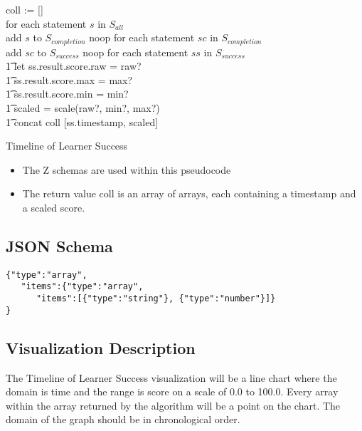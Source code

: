 \documentclass{article}
\begin{document}
  \begin{algorithm}[H]
    \SetAlgoLined
    coll := [] \\
     {
      for each statement $s$ in $S_{all}$ \\
      {
        add $s$ to $S_{completion}$
      }
      {
        noop
      }}
     {
      for each statement $sc$ in $S_{completion}$ \\
      {
        add $sc$ to $S_{success}$
      }
      {
        noop
      }}
     {
      for each statement $ss$ in $S_{success}$ \\
      \t1 let ss.result.score.raw = raw? \\ \t1 \:\:\:\:\:
          ss.result.score.max = max? \\ \t1 \:\:\:\:\:
          ss.result.score.min = min? \\ \t1 \:\:\:\:\:
          scaled = scale(raw?, min?, max?) \\
       \t1 concat coll [ss.timestamp, scaled]
    }
    \caption{Timeline of Learner Success}
  \end{algorithm}
  \begin{itemize}
    \item The Z schemas are used within this pseudocode
    \item The return value coll is an array of arrays, each containing a
      timestamp and a scaled score.
  \end{itemize}

  \subsection{JSON Schema}
\begin{lstlisting}[style=json]
{"type":"array",
   "items":{"type":"array",
      "items":[{"type":"string"}, {"type":"number"}]}
}
\end{lstlisting}

  \subsection{Visualization Description}

  The Timeline of Learner Success visualization will be a line chart
  where the domain is time and the range is score on a scale of 0.0 to
  100.0. Every array within the array returned by the algorithm will
  be a point on the chart.  The domain of the graph should be in
  chronological order. \\
\end{document}
